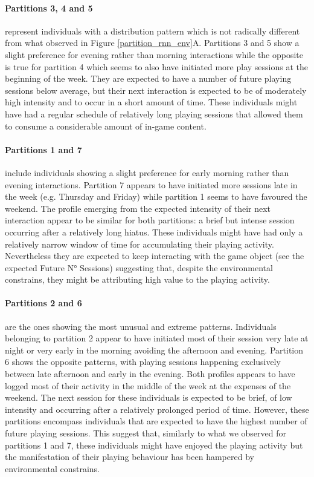 \paragraph*{\textbf{Partitions 3, 4 and 5}} represent individuals with a distribution pattern which is not radically different from what observed in Figure \ref{partition_rnn_env}A. Partitions 3 and 5 show a slight preference for evening rather than morning interactions while the opposite is true for partition 4 which seems to also have initiated more play sessions at the beginning of the week. They are expected to have a number of future playing sessions below average, but their next interaction is expected to be of moderately high intensity and to occur in a short amount of time. These individuals might have had a regular schedule of relatively long playing sessions that allowed them to consume a considerable amount of in-game content.

\paragraph*{\textbf{Partitions 1 and 7}} include individuals showing a slight preference for early morning rather than evening interactions. Partition 7 appears to have initiated more sessions late in the week (e.g. Thursday and Friday) while partition 1 seems to have favoured the weekend. The profile emerging from the expected intensity of their next interaction appear to be similar for both partitions: a brief but intense session occurring after a relatively long hiatus. These individuals might have had only a relatively narrow window of time for accumulating their playing activity.  Nevertheless they are expected to keep interacting with the game object (see the expected Future N° Sessions) suggesting that, despite the environmental constrains, they might be attributing high value to the playing activity.

\paragraph*{\textbf{Partitions 2 and 6}} are the ones showing the most unusual and extreme patterns. Individuals belonging to partition 2 appear to have initiated most of their session very late at night or very early in the morning avoiding the afternoon and evening. Partition 6 shows the opposite patterns, with playing sessions happening exclusively between late afternoon and early in the evening. Both profiles appears to have logged most of their activity in the middle of the week at the expenses of the weekend. The next session for these individuals is expected to be brief, of low intensity and occurring after a relatively prolonged period of time. However, these partitions encompass individuals that are expected to have the highest number of future playing sessions. This suggest that, similarly to what we observed for partitions 1 and 7, these individuals might have enjoyed the playing activity but the manifestation of their playing behaviour has been hampered by environmental constrains.

